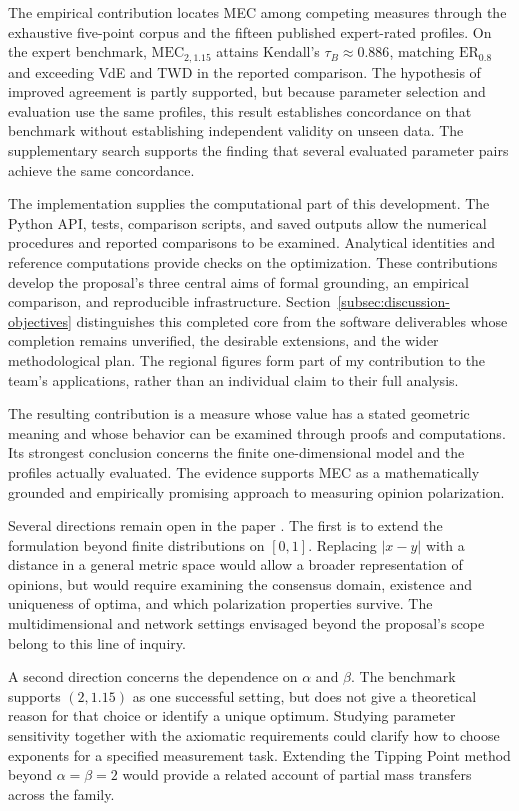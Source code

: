 \documentclass{article}
\theoremstyle{plain}
\theoremstyle{remark}
\begin{document}
The empirical contribution locates MEC among competing measures through the exhaustive five-point corpus and the fifteen published expert-rated profiles. On the expert benchmark, $\mathrm{MEC}_{2,1.15}$ attains Kendall's $\tau_B\approx0.886$, matching $\mathrm{ER}_{0.8}$ and exceeding VdE and TWD in the reported comparison. The hypothesis of improved agreement is partly supported, but because parameter selection and evaluation use the same profiles, this result establishes concordance on that benchmark without establishing independent validity on unseen data. The supplementary search supports the finding that several evaluated parameter pairs achieve the same concordance.

The implementation supplies the computational part of this development. The Python API, tests, comparison scripts, and saved outputs allow the numerical procedures and reported comparisons to be examined. Analytical identities and reference computations provide checks on the optimization. These contributions develop the proposal's three central aims of formal grounding, an empirical comparison, and reproducible infrastructure. Section~\ref{subsec:discussion-objectives} distinguishes this completed core from the software deliverables whose completion remains unverified, the desirable extensions, and the wider methodological plan. The regional figures form part of my contribution to the team's applications, rather than an individual claim to their full analysis.

The resulting contribution is a measure whose value has a stated geometric meaning and whose behavior can be examined through proofs and computations. Its strongest conclusion concerns the finite one-dimensional model and the profiles actually evaluated. The evidence supports MEC as a mathematically grounded and empirically promising approach to measuring opinion polarization.


Several directions remain open in the paper \citep{aranda2026mec}. The first is to extend the formulation beyond finite distributions on $[0,1]$. Replacing $|x-y|$ with a distance in a general metric space would allow a broader representation of opinions, but would require examining the consensus domain, existence and uniqueness of optima, and which polarization properties survive. The multidimensional and network settings envisaged beyond the proposal's scope belong to this line of inquiry.

A second direction concerns the dependence on $\alpha$ and $\beta$. The benchmark supports $(2,1.15)$ as one successful setting, but does not give a theoretical reason for that choice or identify a unique optimum. Studying parameter sensitivity together with the axiomatic requirements could clarify how to choose exponents for a specified measurement task. Extending the Tipping Point method beyond $\alpha=\beta=2$ would provide a related account of partial mass transfers across the family.
\end{document}
